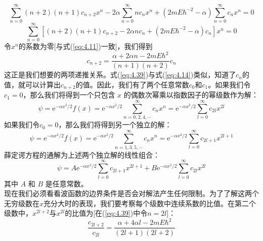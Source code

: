     \begin{equation*}
        \sum_{n=0}^{\infty}\left(n+2\right)\left(n+1\right)c_{n+2}x^n - 2\alpha \sum_{n=0}^{\infty}n c_n x^n + \left(2mE\hbar^{-2} - \alpha\right)\sum_{n=0}^{\infty}c_nx^n = 0
    \end{equation*}
    \begin{equation}
        \sum_{n=0}^{\infty}\left[(n+2)(n+1)c_{n+2} - 2\alpha n c_n + \left(2mE\hbar^{-2} - \alpha\right)c_n\right]x^n = 0
        \label{eq:4.38}
    \end{equation}
    令$x^n$的系数为零[与式(\ref{eq:4.11})一致]，我们得到
    \begin{equation}
        c_{n+2} = \frac{\alpha + 2\alpha n - 2mE\hbar^2}{(n+1)(n+2)}c_n
        \label{eq:4.39}
    \end{equation}
    这正是我们想要的两项递推关系。式(\ref{eq:4.39})与式(\ref{eq:4.14})类似，知道了$c_n$的值，就可以计算出$c_{n+2}$的值。因此，我们有了两个任意常数$c_0$和$c_1$。如果我们令$c_1=0$，那么我们将得到一个只包含 $x$ 的偶数次幂乘以指数因子的幂级数作为解：
    \begin{equation}
        \psi = \mathrm{e}^{-\alpha x^2/2}f\left(x\right) = \mathrm{e}^{-\alpha x^2/2}\sum_{n=0,2,4,\cdots}^{\infty}c_{n}x^{n} = \mathrm{e}^{-\alpha x^2/2}\sum_{l=0}^{\infty}c_{2l}x^{2l}
        \label{eq:4.40}
    \end{equation}
    如果我们令$c_0=0$，那么我们将得到另一个独立的解：
    \begin{equation}
        \psi = \mathrm{e}^{-\alpha x^2/2}f\left(x\right) = \mathrm{e}^{-\alpha x^2/2}\sum_{n=1,3,5,\cdots}^{\infty}c_{n}x^{n} = \mathrm{e}^{-\alpha x^2/2}\sum_{l=0}^{\infty}c_{2l+1}x^{2l+1}
        \label{eq:4.41}
    \end{equation}
    薛定谔方程的通解为上述两个独立解的线性组合：
    \begin{equation}
        \psi = A\mathrm{e}^{-\alpha x^2/2}\sum_{l=0}^{\infty}c_{2l+1}x^{2l+1} + B\mathrm{e}^{-\alpha x^2/2}\sum_{l=0}^{\infty}c_{2l}x^{2l}
        \label{eq:4.42}
    \end{equation}
    其中 $A$ 和 $B$ 是任意常数。\\
    \indent 现在我们必须看看波函数的边界条件是否会对解法产生任何限制。为了了解这两个无穷级数在$x$充分大时的表现，我们要考察每个级数中连续系数的比值。在第二个级数中，$x^{2l+2}$与$x^{2l}$的比值为[在(\ref{eq:4.39})中令$n=2l$]：
    \begin{equation*}
        \frac{c_{2l+2}}{c_{2l}} = \frac{\alpha + 4\alpha l - 2mE\hbar^2}{(2l+1)(2l+2)}
    \end{equation*}
